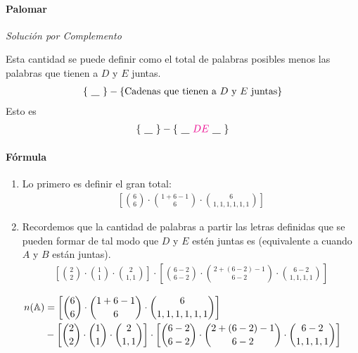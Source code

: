 \paragraph{Palomar}
\textit{Solución por Complemento}

Esta cantidad se puede definir como el total de palabras posibles menos las palabras que tienen a $D$ y $E$ juntas.
\begin{align*}
\left\{~\underline{\hspace{0.3cm}}~\right\}-\left\{\text{Cadenas que tienen a $D$ y $E$ juntas} \right\}
\end{align*}
Esto es
\begin{align*}
\left\{~\underline{\hspace{0.3cm}}~\right\}-\left\{~\underline{\hspace{0.3cm}}~ {\color{magenta} DE} ~\underline{\hspace{0.3cm}}~\right\}
\end{align*}

\paragraph{Fórmula}
\begin{enumerate}
\item Lo primero es definir el gran total:
\begin{align*}
\left[\binom{6}{6}\cdot\binom{1+6-1}{6}\cdot\binom{6}{1,1,1,1,1,1}\right]
\end{align*}
\item Recordemos que la cantidad de palabras a partir las letras definidas que se pueden formar de tal modo que $D$ y $E$ estén juntas es (equivalente a cuando $A$ y $B$ están juntas).
\begin{align*}
\left[\binom{2}{2}\cdot\binom{1}{1}\cdot\binom{2}{1,1}\right]
\cdot
\left[\binom{6-2}{6-2}\cdot\binom{2+(6-2)-1}{6-2}\cdot\binom{6-2}{1,1,1,1}\right]
\end{align*}
\end{enumerate}

\begin{align*}
n(\mathbb{A})&=\left[\binom{6}{6}\cdot\binom{1+6-1}{6}\cdot\binom{6}{1,1,1,1,1,1}\right]\\&-
\left[\binom{2}{2}\cdot\binom{1}{1}\cdot\binom{2}{1,1}\right]
\cdot
\left[\binom{6-2}{6-2}\cdot\binom{2+(6-2)-1}{6-2}\cdot\binom{6-2}{1,1,1,1}\right]
\end{align*}


